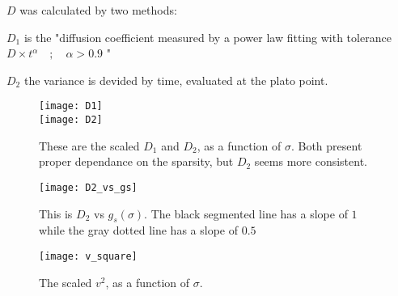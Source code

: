 \documentclass[onecolumn,fleqn]{revtex4}
\begin{document}
$D$ was calculated by two methods:

$D_1$ is the "diffusion
coefficient measured by a power law fitting with 
tolerance $D\times t^{\alpha}\quad ;\quad \alpha>0.9$ " 

$D_2$ the variance is devided by time, evaluated at the plato point.

\begin{figure}[H]
\texttt{[image: D1]} \\
\texttt{[image: D2]} 
\caption{ These are the scaled $D_1$ and $D_2$, as a function of $\sigma$. 
    Both present proper dependance on the sparsity, but $D_2$ seems more consistent.}\label{fig:D}
\end{figure}


\begin{figure}[H]
\texttt{[image: D2\_vs\_gs]} 
\caption{ This is $D_2$ vs $g_s(\sigma)$. The black segmented line has a slope of $1$ while the gray dotted line has a slope of $0.5$}\label{fig:D2_vs_gs}
\end{figure}

\begin{figure}[H]
\texttt{[image: v\_square]} 
\caption{ The scaled $v^2$, as a function of $\sigma$.}\label{fig:v_square}
\end{figure}
\end{document}

